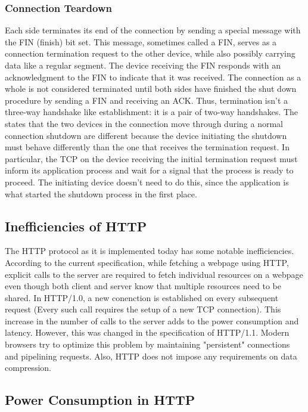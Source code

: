 \documentclass{sigplanconf}
\begin{document}
\subsubsection{Connection Teardown}
Each side terminates its end of the connection by sending a special message with the FIN (finish) bit set. This message, sometimes called a FIN, serves as a connection termination request to the other device, while also possibly carrying data like a regular segment. The device receiving the FIN responds with an acknowledgment to the FIN to indicate that it was received. The connection as a whole is not considered terminated until both sides have finished the shut down procedure by sending a FIN and receiving an ACK.
Thus, termination isn't a three-way handshake like establishment: it is a pair of two-way handshakes. The states that the two devices in the connection move through during a normal connection shutdown are different because the device initiating the shutdown must behave differently than the one that receives the termination request. In particular, the TCP on the device receiving the initial termination request must inform its application process and wait for a signal that the process is ready to proceed. The initiating device doesn't need to do this, since the application is what started the shutdown process in the first place.

\subsection{Inefficiencies of HTTP}
The HTTP protocol as it is implemented today has some notable inefficiencies. According to the current specification, while fetching a webpage using HTTP, explicit calls to the server are required to fetch individual resources on a webpage even though both client and server know that multiple resources need to be shared. In HTTP/1.0, a new conenction is established on every subsequent request (Every such call requires the setup of a new TCP connection). This increase in the number of calls to the server adds to the power consumption and latency. However, this was changed in the specification of HTTP/1.1. Modern browsers try to  optimize this problem by maintaining "persistent" connections and pipelining requests. Also, HTTP does not  impose any requirements on data compression. 

\subsection{Power Consumption in HTTP}
\end{document}
